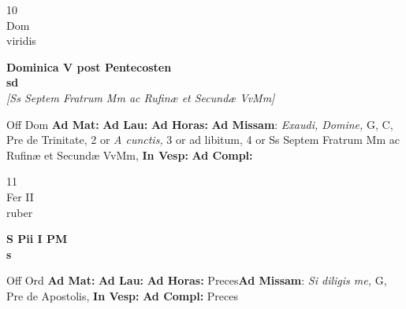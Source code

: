 \documentclass[10pt, openany]{book}
\begin{document}
        \begin{center}
            \begin{minipage}{3.5in}
                \vspace{2em}
                \begin{minipage}{0.5in}
                    {\Huge 10} \\
                    {\normalsize Dom} \\
                    {\normalsize viridis}
                \end{minipage}
                \begin{minipage}{3.0in}
                    \textbf{ \large Dominica V post Pentecosten \\
                    \textnormal{\normalsize sd}} \\ \textit{[Ss Septem Fratrum Mm ac Rufinæ et Secundæ VvMm]} \\ 
                \end{minipage}
                \begin{justify}Off Dom
                    \textbf{Ad Mat: }
                    \textbf{Ad Lau: }
                    \textbf{Ad Horas: }\textbf{Ad Missam}: \textit{Exaudi, Domine,} G, C, Pre de Trinitate, 2 or \textit{A cunctis,} 3 or ad libitum, 4 or Ss Septem Fratrum Mm ac Rufinæ et Secundæ VvMm,  
                    \textbf{In Vesp: }
                    \textbf{Ad Compl: }
                \end{justify}
            \end{minipage}
        \end{center}
    
        \begin{center}
            \begin{minipage}{3.5in}
                \vspace{2em}
                \begin{minipage}{0.5in}
                    {\Huge 11} \\
                    {\normalsize Fer II} \\
                    {\normalsize ruber}
                \end{minipage}
                \begin{minipage}{3.0in}
                    \textbf{ \large S Pii I PM \\
                    \textnormal{\normalsize s}} \\ 
                \end{minipage}
                \begin{justify}Off Ord
                    \textbf{Ad Mat: }
                    \textbf{Ad Lau: }
                    \textbf{Ad Horas: }Preces\textbf{Ad Missam}: \textit{Si diligis me,} G, Pre de Apostolis,  
                    \textbf{In Vesp: }
                    \textbf{Ad Compl: }Preces
                \end{justify}
            \end{minipage}
        \end{center}
    
\end{document}
